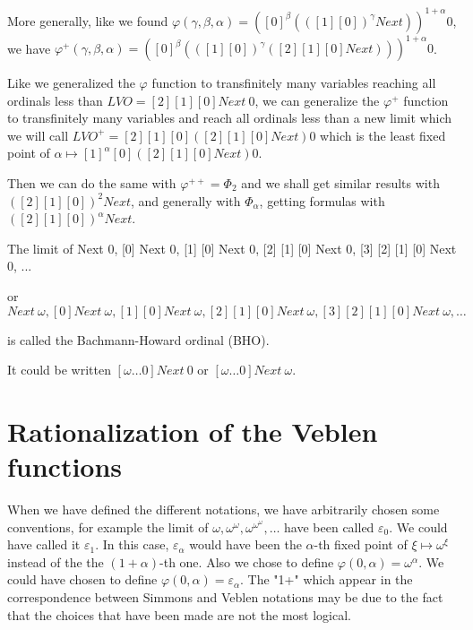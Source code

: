 \documentclass[10pt]{article}
\begin{document}
More generally, like we found \( \varphi(\gamma,\beta,\alpha) = ([0]^\beta (([1] [0])^\gamma Next))^{1+\alpha} 0 \), we have \( \varphi^+(\gamma,\beta,\alpha) = ([0]^\beta (([1] [0])^\gamma ([2] [1] [0] Next)))^{1+\alpha} 0 \).

Like we generalized the \( \varphi \) function to transfinitely many variables reaching all ordinals less than \( LVO = [2] [1] [0] Next\ 0 \), we can generalize the \( \varphi^+ \) function to transfinitely many variables and reach all ordinals less than a new limit which we will call \( LVO^+ = [2] [1] [0] ([2] [1] [0] Next) 0 \) which is the least fixed point of \( \alpha \mapsto [1]^\alpha [0] ([2] [1] [0] Next) 0 \).

Then we can do the same with \( \varphi^{++} = \Phi_2 \) and we shall get similar results with \( ([2] [1] [0])^2 Next \), and generally with \( \Phi_\alpha \), getting formulas with \( ([2] [1] [0])^\alpha Next \).


\bigskip



The limit of Next 0, [0] Next 0, [1] [0] Next 0, [2] [1] [0] Next 0, [3] [2] [1] [0] Next 0, ... 

or \( Next\ \omega, [0] Next\ \omega, [1] [0] Next\ \omega, [2] [1] [0] Next\ \omega, [3] [2] [1] [0] Next\ \omega, \ldots \) 

is called the Bachmann-Howard ordinal (BHO). 

It could be written \( [\omega \ldots 0] Next\ 0 \) or \( [\omega \ldots 0] Next\ \omega \).


\section{Rationalization of the Veblen functions}

When we have defined the different notations, we have arbitrarily chosen some conventions, for example the limit of \( \omega, \omega^\omega, \omega^{\omega^\omega}, \ldots \) have been called  \( \varepsilon_0 \). We could have called it \( \varepsilon_1 \). In this case, \( \varepsilon_\alpha \) would have been the \( \alpha \)-th fixed point of \( \xi \mapsto \omega^\xi \) instead of the the \( (1+\alpha) \)-th one. Also we chose to define \( \varphi(0,\alpha) = \omega^\alpha \). We could have chosen to define \( \varphi(0,\alpha) = \varepsilon_\alpha \). The "1+" which appear in the correspondence between Simmons and Veblen notations may be due to the fact that the choices that have been made are not the most logical. 
\end{document}
